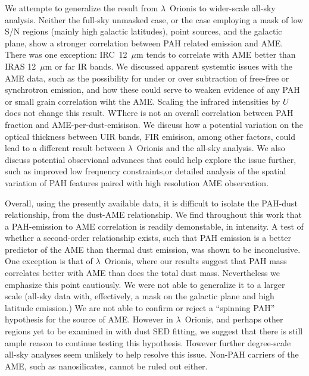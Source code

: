 \documentclass[12pt,a4paper]{article}
\begin{document}
We attempte to generalize the result from $\lambda$~Orionis to wider-scale all-sky analysis. Neither the full-sky unmasked case, or the case employing a mask of low S/N regions (mainly high galactic latitudes), point sources, and the galactic plane, show a stronger correlation between PAH related emission and AME. There was one exception: IRC~12~$\mu$m tends to correlate with AME better than IRAS 12~$\mu$m or far IR bands. We discussed apparent systemtic issues with the AME data, such as the possibility for under or over subtraction of free-free or synchrotron emission, and how these could serve to weaken evidence of any PAH or small grain correlation wiht the AME. Scaling the infrared intensities by $U$ does not change this result. WThere is not an overall correlation between PAH fraction and AME-per-dust-emisison. We discuss how a potential variation on the optical thickness between UIR bands, FIR emisison, among other factors, could lead to a different result between $\lambda$~Orionis and the all-sky analysis. We also discuss potential observional advances that could help explore the issue further, such as improved low frequency constraints,or detailed analysis of the spatial variation of PAH features paired with high resolution AME observation.

Overall, using the presently available data, it is difficult to isolate the PAH-dust relationship, from the dust-AME relationship. We find throughout this work that a PAH-emission to AME correlation is readily demonstable, in intensity. A test of whether a second-order relationship exists, such that PAH emission is a better predictor of the AME than thermal dust emission, was shown to be inconclusive. One exception is that of $\lambda$~Orionis, where our results suggest that PAH mass correlates better with AME than does the total dust mass. Nevertheless we emphasize this point cautiously. We were not able to generalize it to a larger scale (all-sky data with, effectively, a mask on the galactic plane and high latitude emission.)  We are not able to confirm or reject a ``spinning PAH'' hypothesis for the source of AME. However in $\lambda$~Orionis, and perhaps other regions yet to be examined in with dust SED fitting, we suggest that there is still ample reason to continue testing this hypothesis. However further degree-scale all-sky analyses seem unlikely to help resolve this issue. Non-PAH carriers of the AME, such as nanosilicates, cannot be ruled out either.
\end{document}
